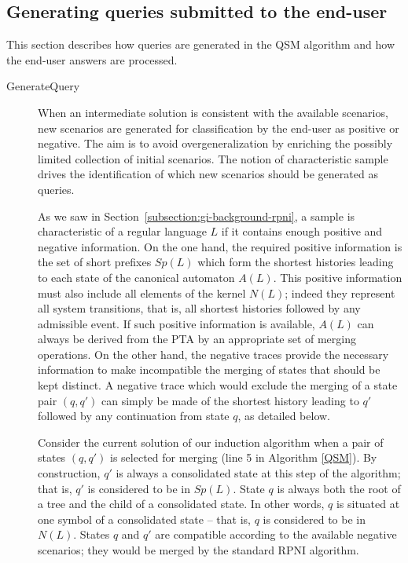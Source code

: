 \subsection{Generating queries submitted to the end-user\label{QSM:query}}

This section describes how queries are generated in the \textsc{QSM} algorithm and how the end-user answers are processed.

\begin{description}

\item[GenerateQuery] When an intermediate solution is consistent with the available scenarios, new scenarios are generated for classification by the end-user as positive or negative. The aim is to avoid overgeneralization by enriching the possibly limited collection of initial scenarios. The notion of characteristic sample drives the identification of which new scenarios should be generated as queries. 

As we saw in Section~\ref{subsection:gi-background-rpni}, a sample is characteristic of a regular language $L$ if it contains enough positive and negative information. On the one hand, the required positive information is the set of short prefixes $Sp(L)$ which form the shortest histories leading to each state of the canonical automaton $A(L)$. This positive information must also include all elements of the kernel $N(L)$; indeed they represent all system transitions, that is, all shortest histories followed by any admissible event. If such positive information is available, $A(L)$ can always be derived from the PTA by an appropriate set of merging operations. On the other hand, the negative traces provide the necessary information to make incompatible the merging of states that should be kept distinct. A negative trace which would exclude the merging of a state pair $(q, q')$ can simply be made of the shortest history leading to $q'$ followed by any continuation from state $q$, as detailed below.

Consider the current solution of our induction algorithm when a pair of states $(q, q')$ is selected for merging (line 5 in Algorithm \ref{QSM}). By construction, $q'$ is always a consolidated state at this step of the algorithm; that is, $q'$ is considered to be in $Sp(L)$. State $q$ is always both the root of a tree and the child of a consolidated state. In other words, $q$ is situated at one symbol of a consolidated state -- that is, $q$ is considered to be in $N(L)$. States $q$ and $q'$ are compatible according to the available negative scenarios; they would be merged by the standard RPNI algorithm. 


\end{description}
